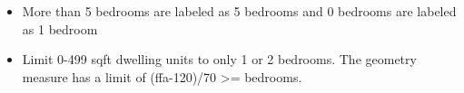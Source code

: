 \begin{itemize}
\item More than 5 bedrooms are labeled as 5 bedrooms and 0 bedrooms are labeled as 1 bedroom
\item Limit 0-499 sqft dwelling units to only 1 or 2 bedrooms. The geometry measure has a limit of (ffa-120)/70 >= bedrooms.
\end{itemize}
